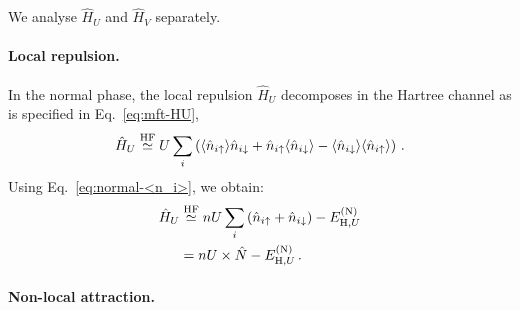 \begin{tabproof}
	
	We analyse $\hat H_U$ and $\hat H_V$ separately.

	\paragraph{Local repulsion.}
	
	In the normal phase, the local repulsion $\hat H_U$ decomposes in the Hartree channel as is specified in Eq.~\eqref{eq:mft-HU},
	\[
		\hat H_U \stackrel{\mathrm{HF}}{\simeq}
		U \sum_{i} \left(
			\langle 
				\hat n_{i\uparrow}
			\rangle \hat n_{i\downarrow} + \hat n_{i\uparrow} \langle 
				\hat n_{i\downarrow}
			\rangle - \langle 
				\hat n_{i\downarrow}
			\rangle \langle 
				\hat n_{i\uparrow}
				\rangle
		\right) \, .
	\]
	Using Eq.~\eqref{eq:normal-<n_i>}, we obtain:
	\begin{align}
		\hat H_U &\stackrel{\mathrm{HF}}{\simeq}
		nU \sum_i \left(
			 \hat n_{i\uparrow} + \hat n_{i\downarrow}
		\right)
		- E_{\mathrm{H},U}^{(\mathrm{N})}\\
		&= nU \times \hat N - E_{\mathrm{H},U}^{(\mathrm{N})} \, . \label{eq:normal-HU-hartree-approx}
	\end{align}
	
	\paragraph{Non-local attraction.}
	

\end{tabproof}
